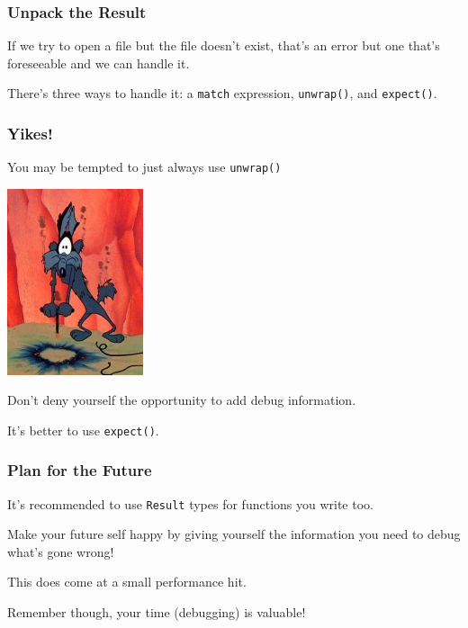 \begin{frame}
\frametitle{Unpack the Result}

If we try to open a file but the file doesn't exist, that's an error but one that's foreseeable and we can handle it. 

There's three ways to handle it: a \texttt{match} expression, \texttt{unwrap()}, and \texttt{expect()}. 


\end{frame}


\begin{frame}
\frametitle{Yikes!}

You may be tempted to just always use \texttt{unwrap()}

\begin{center}
	\includegraphics[width=0.3\textwidth]{images/coyote.jpg}
\end{center}

Don't deny yourself the opportunity to add debug information.

It's better to use \texttt{expect()}.

\end{frame}


\begin{frame}
\frametitle{Plan for the Future}

It's recommended to use \texttt{Result} types for functions you write too. 

Make your future self happy by giving yourself the information you need to debug what's gone wrong!

This does come at a small performance hit. 

Remember though, your time (debugging) is valuable!

\end{frame}


